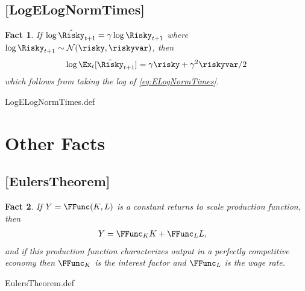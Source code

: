 \message{ !name(MathFactsList.tex)}\documentclass{handout}
\newtheorem{Fact}{Fact}
\begin{document}
\hypertarget{LogELogNormTimes}{}
\subsection{[LogELogNormTimes]}

\begin{Fact} If $\log \hat{\Risky}_{t+1} = \gamma \log \Risky_{t+1}$ where $\log \Risky_{t+1} \sim \mathcal{N}(\risky,\riskyvar)$, then
\begin{equation}
        \log \Ex_{t}[\hat{\Risky}_{t+1}] = \gamma \risky+\gamma^{2}\riskyvar/2 \label{eq:LogELogNormTimes}
\end{equation}
which follows from taking the log of \eqref{eq:ELogNormTimes}.

\end{Fact}

\begin{verbatimwrite}{LogELogNormTimes.def}
\providecommand{\LogELogNormTimes}{\href{https://www.econ2.jhu.edu/people/ccarroll/public/LectureNotes/MathFacts/MathFactsList\#LogELogNormTimes}{\ensuremath{\mathtt{[LogELogNormTimes]}}}}
\end{verbatimwrite}




\section{Other Facts}

\hypertarget{EulersTheorem}{}
\subsection{[EulersTheorem]}\label{fact:EulersTheorem}

\begin{Fact} If $Y=\FFunc(K,L)$ is a constant returns to scale production
function, then
\begin{equation}\begin{gathered}\begin{aligned}
        Y & =  \FFunc_{K} K + \FFunc_{L} L,
\end{aligned}\end{gathered}\end{equation}
and if this production function characterizes output in a perfectly 
competitive economy then $\FFunc_{K}$ is the interest factor and $\FFunc_{L}$ is
the wage rate.

\end{Fact}
\begin{verbatimwrite}{EulersTheorem.def}
\providecommand{\EulersTheorem}{\href{https://www.econ2.jhu.edu/people/ccarroll/public/LectureNotes/MathFacts/MathFactsList\#EulersTheorem}{\ensuremath{\mathtt{[EulersTheorem]}}}}
\end{verbatimwrite}

\end{document}
